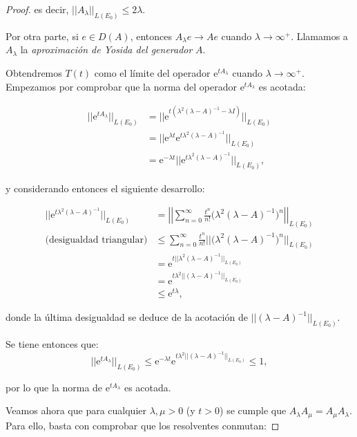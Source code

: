 \begin{proof}
    es decir, $||A_\lambda||_{L(E_0)} \leq 2\lambda$.

    Por otra parte, si $e \in D(A)$, entonces $A_\lambda e \rightarrow Ae$ cuando $\lambda \rightarrow \infty^+$. Llamamos a $A_\lambda$ la \textit{aproximación de Yosida del generador} $A$.

    Obtendremos $T(t)$ como el límite del operador $\mathrm{e}^{tA_\lambda}$ cuando $\lambda \rightarrow \infty^+$. Empezamos por comprobar que la norma del operador $\mathrm{e}^{tA_\lambda}$ es acotada:

    \begin{align*}
        ||\mathrm{e}^{tA_\lambda}||_{L(E_0)} &= ||\mathrm{e}^{t(\lambda^2(\lambda - A)^{-1} - \lambda I)}||_{L(E_0)}\\
        &=||\mathrm{e}^{\lambda t}\mathrm{e}^{t\lambda^2(\lambda - A)^{-1}}||_{L(E_0)}\\
        &=\mathrm{e}^{-\lambda t} ||\mathrm{e}^{t\lambda^2(\lambda - A)^{-1}}||_{L(E_0)},
    \end{align*}

    y considerando entonces el siguiente desarrollo:

    \begin{align*}
        ||\mathrm{e}^{t\lambda^2(\lambda - A)^{-1}}||_{L(E_0)} &= \left | \left |\sum_{n=0}^\infty \frac{t^n}{n!}\big(\lambda^2(\lambda - A)^{-1}\big)^n \right | \right |_{L(E_0)}\\
        \text{(desigualdad triangular)} &\leq \sum_{n=0}^\infty \frac{t^n}{n!}\Big | \Big |\big(\lambda^2(\lambda - A)^{-1}\big)^n \Big | \Big |_{L(E_0)}\\
        &=\mathrm{e}^{t ||\lambda^2 (\lambda - A)^{-1}||_{L(E_0)}}\\
        &=\mathrm{e}^{t\lambda^2 ||(\lambda - A)^{-1}||_{L(E_0)}}\\
        &\leq \mathrm{e}^{t\lambda},
    \end{align*}

    donde la última desigualdad se deduce de la acotación de $||(\lambda -A)^{-1}||_{L(E_0)}$.

    Se tiene entonces que:
    \[||\mathrm{e}^{tA_\lambda}||_{L(E_0)} \leq \mathrm{e}^{-\lambda t}\mathrm{e}^{t\lambda^2 ||(\lambda - A)^{-1}||_{L(E_0)}} \leq 1,\]

    por lo que la norma de $\mathrm{e}^{tA_\lambda}$ es acotada.

    Veamos ahora que para cualquier $\lambda, \mu > 0$ (y $t > 0$) se cumple que $A_\lambda A_\mu = A_\mu A_\lambda$. Para ello, basta con comprobar que los resolventes conmutan:


\end{proof}
